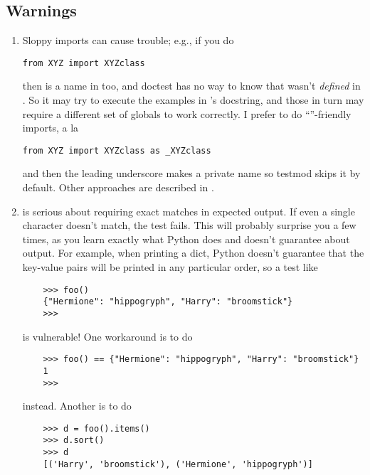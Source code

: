 \subsection{Warnings}

\begin{enumerate}

\item Sloppy imports can cause trouble; e.g., if you do

\begin{verbatim}
from XYZ import XYZclass
\end{verbatim}

then  is a name in  too, and doctest
has no way to know that  wasn't \emph{defined} in
.  So it may try to execute the examples in
's docstring, and those in turn may require a
different set of globals to work correctly.  I prefer to do
``''-friendly imports, a la

\begin{verbatim}
from XYZ import XYZclass as _XYZclass
\end{verbatim}

and then the leading underscore makes  a private name so
testmod skips it by default.  Other approaches are described in
.

\item {} is serious about requiring exact matches in expected
  output.  If even a single character doesn't match, the test fails.  This
  will probably surprise you a few times, as you learn exactly what Python
  does and doesn't guarantee about output.  For example, when printing a
  dict, Python doesn't guarantee that the key-value pairs will be printed
  in any particular order, so a test like

\begin{verbatim}
    >>> foo()
    {"Hermione": "hippogryph", "Harry": "broomstick"}
    >>>
\end{verbatim}

is vulnerable!  One workaround is to do

\begin{verbatim}
    >>> foo() == {"Hermione": "hippogryph", "Harry": "broomstick"}
    1
    >>>
\end{verbatim}

instead.  Another is to do

\begin{verbatim}
    >>> d = foo().items()
    >>> d.sort()
    >>> d
    [('Harry', 'broomstick'), ('Hermione', 'hippogryph')]
\end{verbatim}


\end{enumerate}
